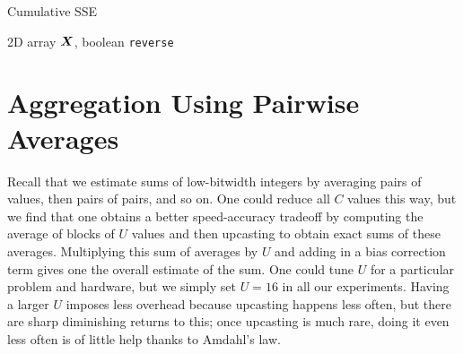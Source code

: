 \begin{algorithm}[h]
\caption{Cumulative SSE} \label{algo:cumSSE}
\begin{algorithmic}[1]
     2D array $\bm{X}$, boolean \texttt{reverse}
    \ENDIF


    \ENDFOR

        \ENDFOR
    \ENDFOR
\end{algorithmic}
\end{algorithm}

\clearpage
\section{Aggregation Using Pairwise Averages} \label{sec:aggregateAnalysis}

Recall that we estimate sums of low-bitwidth integers by averaging pairs of values, then pairs of pairs, and so on. One could reduce all $C$ values this way, but we find that one obtains a better speed-accuracy tradeoff by computing the average of blocks of $U$ values and then upcasting to obtain exact sums of these averages. Multiplying this sum of averages by $U$ and adding in a bias correction term gives one the overall estimate of the sum. One could tune $U$ for a particular problem and hardware, but we simply set $U = 16$ in all our experiments. Having a larger $U$ imposes less overhead because upcasting happens less often, but there are sharp diminishing returns to this; once upcasting is much rare, doing it even less often is of little help thanks to Amdahl's law.


